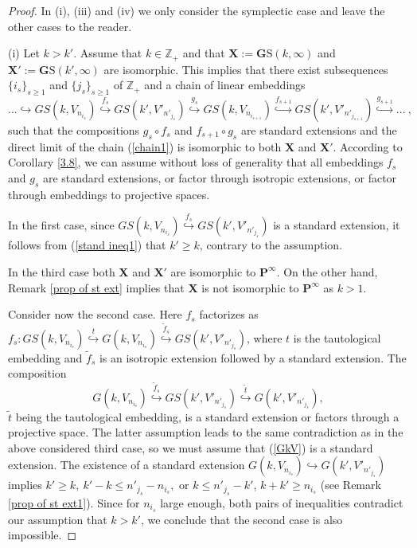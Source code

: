 \documentclass[12pt]{amsart}
\theoremstyle{definition}
\begin{document}
\begin{proof}
In (i), (iii) and (iv) we only consider the symplectic case and leave the other cases to the reader.

(i) Let $k>k'$. Assume that $k\in\mathbb{Z}_{+}$ and that $\mathbf{X}:=\mathbf{G}\mathrm{S}(k,\infty)$ and
$\mathbf{X}':=\mathbf{G}\mathrm{S}(k',\infty)$ are isomorphic. This implies that there exist
subsequences $\{i_s\}_{s\ge1}$ and $\{j_s\}_{s\ge1}$ of $\mathbb{Z}_{+}$ and
a chain of linear embeddings
\begin{equation}\label{chain1}
...\hookrightarrow GS(k,V_{n_{i_s}})\overset{f_s}\hookrightarrow GS(k',V'_{n'_{j_s}})\overset{g_s}\hookrightarrow
GS(k,V_{n_{i_{s+1}}})\overset{f_{s+1}}\hookrightarrow GS(k',V'_{n'_{j_{s+1}}})\overset{g_{s+1}}\hookrightarrow ...\ ,
\end{equation}
such that the compositions $g_s\circ f_s$ and $f_{s+1}\circ g_s$ are standard extensions and
the direct limit of the chain (\ref{chain1}) is isomorphic to both $\mathbf{X}$ and $\mathbf{X}'$.
According to Corollary \ref{3.8}, we can assume without loss of generality that all embeddings $f_s$ and $g_s$ are
standard extensions, or factor through isotropic extensions, or factor through embeddings to projective spaces.

In the first case, since
$GS(k,V_{n_{i_s}})\overset{f_s}\hookrightarrow GS(k',V'_{n'_{j_s}})$
is a standard extension, it follows from (\ref{stand ineq1}) that $k'\ge k$, contrary to the assumption.

In the third case both $\mathbf{X}$ and $\mathbf{X}'$ are isomorphic to $\mathbf{P}^\infty$.
On the other hand, Remark \ref{prop of st ext} implies that $\mathbf{X}$ is not isomorphic to
$\mathbf{P}^\infty$ as $k>1$.


Consider now the second case. Here $f_s$ factorizes as
$f_s: GS(k,V_{n_{i_s}})\overset{t}\hookrightarrow G(k,V_{n_{i_s}})\overset{\tilde{f}_s}\hookrightarrow
GS(k',V'_{n'_{j_s}})$,
where $t$ is the tautological embedding and $\tilde{f}_s$ is an isotropic extension followed by a standard extension.
The composition
\begin{equation}\label{GkV}
G(k,V_{n_{i_s}})\overset{\tilde{f}_s}\hookrightarrow GS(k',V'_{n'_{j_s}})\overset{\tilde{t}}\hookrightarrow
G(k',V'_{n'_{j_s}}),
\end{equation}
$\tilde{t}$ being the tautological embedding, is a standard extension or factors through a projective space.
The latter assumption leads to the same contradiction as in the above considered third case, so we must assume that
(\ref{GkV}) is a standard extension. The existence of a standard extension
$G(k,V_{n_{i_s}})\hookrightarrow G(k',V'_{n'_{j_s}})$ implies $k'\ge k,\ k'-k\le n'_{j_s}-n_{i_s},$ or
$k\le n'_{j_s}-k'$, $k+k'\ge n_{i_s}$ (see Remark \ref{prop of st ext1}). Since for $n_{i_s}$ large enough, both pairs
of inequalities contradict our assumption that $k>k'$, we conclude that the second case is also impossible.


\end{proof}
\end{document}
